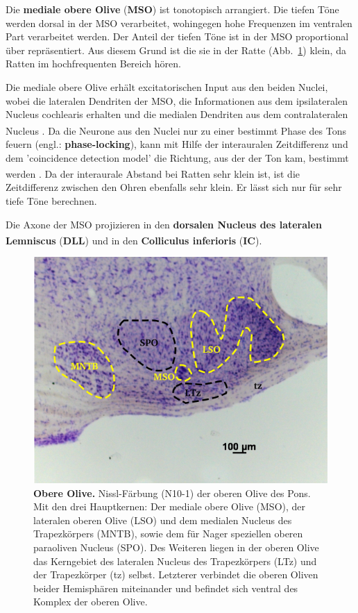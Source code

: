 \documentclass[12pt,a4paper,pdftex]{article}
\begin{document}
\noindent Die \textbf{mediale obere Olive} (\textbf{MSO}) ist tonotopisch arrangiert. Die tiefen Töne werden dorsal in der MSO verarbeitet, wohingegen hohe Frequenzen im ventralen Part verarbeitet werden. Der Anteil der tiefen Töne ist in der MSO proportional über repräsentiert. Aus diesem Grund ist die sie in der Ratte (Abb.~\ref{fig:obere_Olive}) klein, da Ratten im hochfrequenten Bereich hören.

Die mediale obere Olive erhält excitatorischen Input aus den beiden Nuclei, wobei die lateralen Dendriten der MSO, die Informationen aus dem ipsilateralen Nucleus cochlearis erhalten und die medialen Dendriten aus dem contralateralen Nucleus \textsuperscript{\cite[29]{paxinos2014rat}}. Da die Neurone aus den Nuclei nur zu einer bestimmt Phase des Tons feuern (engl.: \textbf{phase-locking}), kann mit Hilfe der interauralen Zeitdifferenz und dem 'coincidence detection model' die Richtung, aus der der Ton kam, bestimmt werden \textsuperscript{\cite[31]{kandel2013principles}}. Da der interaurale Abstand bei Ratten sehr klein ist, ist die Zeitdifferenz zwischen den Ohren ebenfalls sehr klein. Er lässt sich nur für sehr tiefe Töne berechnen.

Die Axone der MSO projizieren in den \textbf{dorsalen Nucleus des lateralen Lemniscus} (\textbf{DLL}) und in den \textbf{Colliculus inferioris} (\textbf{IC})\textsuperscript{\cite[29]{paxinos2014rat}}.
\\

\begin{figure}[H]
    \centering
    \includegraphics{pictures/auditory/obere_olive.png}
    \caption[Obere Olive]{\textbf{Obere Olive.} Nissl-Färbung (N10-1) der oberen Olive des Pons. Mit den drei Hauptkernen: Der mediale obere Olive (MSO), der lateralen oberen Olive (LSO) und dem medialen Nucleus des Trapezkörpers (MNTB), sowie dem für Nager speziellen oberen paraoliven Nucleus (SPO). Des Weiteren liegen in der oberen Olive das Kerngebiet des lateralen Nucleus des Trapezkörpers (LTz) und der Trapezkörper (tz) selbst. Letzterer verbindet die oberen Oliven beider Hemisphären miteinander und befindet sich ventral des Komplex der oberen Olive.}
    \label{fig:obere_Olive}
\end{figure}
\end{document}
